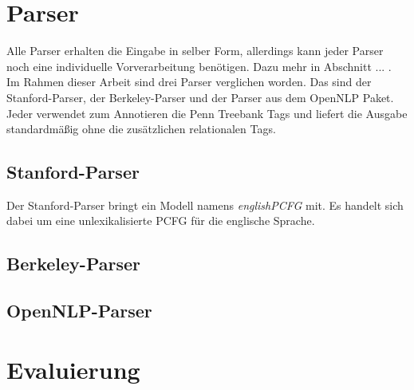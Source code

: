 \section{Parser}

Alle Parser erhalten die Eingabe in selber Form, allerdings kann jeder Parser noch eine individuelle Vorverarbeitung benötigen. Dazu mehr in Abschnitt ... . %
Im Rahmen dieser Arbeit sind drei Parser verglichen worden. Das sind der Stanford-Parser, der Berkeley-Parser und der Parser aus dem OpenNLP Paket. Jeder verwendet zum Annotieren die Penn Treebank Tags und liefert die Ausgabe standardmäßig ohne die zusätzlichen relationalen Tags.



\subsection{Stanford-Parser}
Der Stanford-Parser bringt ein Modell namens \textit{englishPCFG} mit. Es handelt sich dabei um eine unlexikalisierte PCFG für die englische Sprache. 
\subsection{Berkeley-Parser}

\subsection{OpenNLP-Parser}


\section{Evaluierung}

